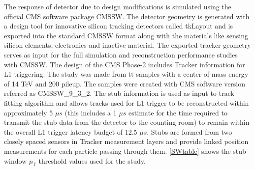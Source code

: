 The response of detector due to design modifications is simulated using the official CMS software package CMSSW. The detector geometry is generated with a design tool for innovative silicon tracking detectors called tkLayout \cite{tkLayout} and is exported into the standard CMSSW format along with the materials like sensing silicon elements, electronics and inactive material. The exported tracker geometry serves as input for the full simulation and reconstruction performance studies with CMSSW. The design of the CMS Phase-2 includes Tracker information for L1 triggering. The study was made from t$\bar{\text{t}}$ samples with a center-of-mass energy of 14 TeV and 200 pileup. The samples were created with CMS software version referred as CMSSW\_9\_3\_2. The stub information is used as input to track fitting algorithm and allows tracks used for L1 trigger to be reconstructed within approximately 5 $\mu s$ (this includes a 1 $\mu s$ estimate for the time required to transmit the stub data from the detector to the counting room) to remain within the overall L1 trigger latency budget of 12.5 $\mu s$. Stubs are formed from two closely spaced sensors in Tracker measurement layers and provide linked position measurements for each particle passing through them. \autoref{SWtable} shows the stub window $p_\text{T}$ threshold values used for the study.

